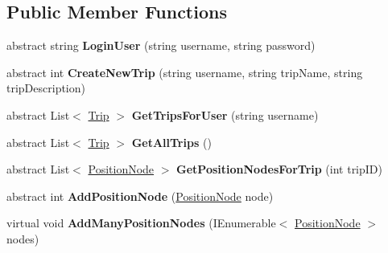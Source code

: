\subsection*{Public Member Functions}
\begin{DoxyCompactItemize}
\item 
\hypertarget{class_tripi_w_c_f_1_1_service_1_1_trip_service_a7c3eb9904b7470d8c4e0c30e40c2e5df}{
abstract string {\bfseries LoginUser} (string username, string password)}
\label{class_tripi_w_c_f_1_1_service_1_1_trip_service_a7c3eb9904b7470d8c4e0c30e40c2e5df}

\item 
\hypertarget{class_tripi_w_c_f_1_1_service_1_1_trip_service_abe14b17b96b898b11055fe36e6baa8a8}{
abstract int {\bfseries CreateNewTrip} (string username, string tripName, string tripDescription)}
\label{class_tripi_w_c_f_1_1_service_1_1_trip_service_abe14b17b96b898b11055fe36e6baa8a8}

\item 
\hypertarget{class_tripi_w_c_f_1_1_service_1_1_trip_service_a549b76b215bf4315e34c843282ceb34e}{
abstract List$<$ \hyperlink{class_tripi_w_c_f_1_1_service_1_1_trip}{Trip} $>$ {\bfseries GetTripsForUser} (string username)}
\label{class_tripi_w_c_f_1_1_service_1_1_trip_service_a549b76b215bf4315e34c843282ceb34e}

\item 
\hypertarget{class_tripi_w_c_f_1_1_service_1_1_trip_service_ae0923d3a21274fcb0d745e11c6cdac58}{
abstract List$<$ \hyperlink{class_tripi_w_c_f_1_1_service_1_1_trip}{Trip} $>$ {\bfseries GetAllTrips} ()}
\label{class_tripi_w_c_f_1_1_service_1_1_trip_service_ae0923d3a21274fcb0d745e11c6cdac58}

\item 
\hypertarget{class_tripi_w_c_f_1_1_service_1_1_trip_service_a6f83e8b557bf92513706d0804fe3f695}{
abstract List$<$ \hyperlink{class_tripi_w_c_f_1_1_service_1_1_position_node}{PositionNode} $>$ {\bfseries GetPositionNodesForTrip} (int tripID)}
\label{class_tripi_w_c_f_1_1_service_1_1_trip_service_a6f83e8b557bf92513706d0804fe3f695}

\item 
\hypertarget{class_tripi_w_c_f_1_1_service_1_1_trip_service_a9a6ada24dc3934203ecc97d16e5d94cf}{
abstract int {\bfseries AddPositionNode} (\hyperlink{class_tripi_w_c_f_1_1_service_1_1_position_node}{PositionNode} node)}
\label{class_tripi_w_c_f_1_1_service_1_1_trip_service_a9a6ada24dc3934203ecc97d16e5d94cf}

\item 
\hypertarget{class_tripi_w_c_f_1_1_service_1_1_trip_service_af7fd2655125dfe5873758ca91098c7da}{
virtual void {\bfseries AddManyPositionNodes} (IEnumerable$<$ \hyperlink{class_tripi_w_c_f_1_1_service_1_1_position_node}{PositionNode} $>$ nodes)}
\label{class_tripi_w_c_f_1_1_service_1_1_trip_service_af7fd2655125dfe5873758ca91098c7da}


\end{DoxyCompactItemize}
